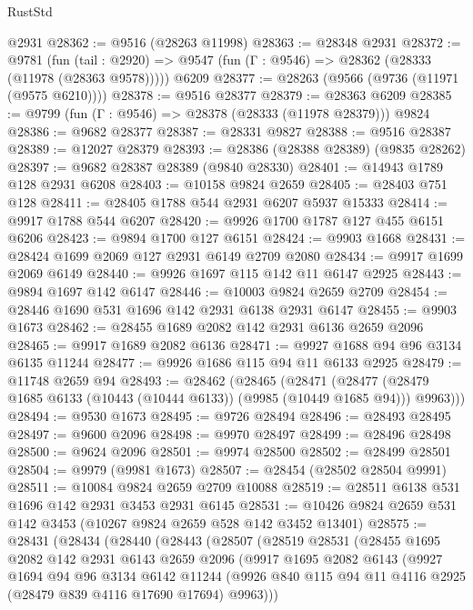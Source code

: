 \begin{lexlean}{RustStd}
\begin{coremodule}
    @2931
@28362 := @9516 (@28263 @11998)
@28363 := @28348 @2931
@28372 := @9781
    (fun (tail : @2920) => @9547 (fun (Γ : @9546) => @28362 (@28333 (@11978 (@28363 @9578)))))
    @6209
@28377 := @28263 (@9566 (@9736 (@11971 (@9575 @6210))))
@28378 := @9516 @28377
@28379 := @28363 @6209
@28385 := @9799 (fun (Γ : @9546) => @28378 (@28333 (@11978 @28379))) @9824
@28386 := @9682 @28377
@28387 := @28331 @9827
@28388 := @9516 @28387
@28389 := @12027 @28379
@28393 := @28386 (@28388 @28389) (@9835 @28262)
@28397 := @9682 @28387 @28389 (@9840 @28330)
@28401 := @14943 @1789 @128 @2931 @6208
@28403 := @10158 @9824 @2659
@28405 := @28403 @751 @128
@28411 := @28405 @1788 @544 @2931 @6207 @5937 @15333
@28414 := @9917 @1788 @544 @6207
@28420 := @9926 @1700 @1787 @127 @455 @6151 @6206
@28423 := @9894 @1700 @127 @6151
@28424 := @9903 @1668
@28431 := @28424 @1699 @2069 @127 @2931 @6149 @2709 @2080
@28434 := @9917 @1699 @2069 @6149
@28440 := @9926 @1697 @115 @142 @11 @6147 @2925
@28443 := @9894 @1697 @142 @6147
@28446 := @10003 @9824 @2659 @2709
@28454 := @28446 @1690 @531 @1696 @142 @2931 @6138 @2931 @6147
@28455 := @9903 @1673
@28462 := @28455 @1689 @2082 @142 @2931 @6136 @2659 @2096
@28465 := @9917 @1689 @2082 @6136
@28471 := @9927 @1688 @94 @96 @3134 @6135 @11244
@28477 := @9926 @1686 @115 @94 @11 @6133 @2925
@28479 := @11748 @2659 @94
@28493 := @28462
    (@28465
      (@28471
        (@28477 (@28479 @1685 @6133 (@10443 (@10444 @6133)) (@9985 (@10449 @1685 @94))) @9963)))
@28494 := @9530 @1673
@28495 := @9726 @28494
@28496 := @28493 @28495
@28497 := @9600 @2096
@28498 := @9970 @28497
@28499 := @28496 @28498
@28500 := @9624 @2096
@28501 := @9974 @28500
@28502 := @28499 @28501
@28504 := @9979 (@9981 @1673)
@28507 := @28454 (@28502 @28504 @9991)
@28511 := @10084 @9824 @2659 @2709 @10088
@28519 := @28511 @6138 @531 @1696 @142 @2931 @3453 @2931 @6145
@28531 := @10426 @9824 @2659 @531 @142 @3453 (@10267 @9824 @2659 @528 @142 @3452 @13401)
@28575 := @28431
    (@28434
      (@28440
        (@28443
          (@28507
            (@28519
              @28531
              (@28455
                @1695
                @2082
                @142
                @2931
                @6143
                @2659
                @2096
                (@9917
                  @1695
                  @2082
                  @6143
                  (@9927
                    @1694
                    @94
                    @96
                    @3134
                    @6142
                    @11244
                    (@9926 @840 @115 @94 @11 @4116 @2925 (@28479 @839 @4116 @17690 @17694) @9963)))

\end{coremodule}
\end{lexlean}
